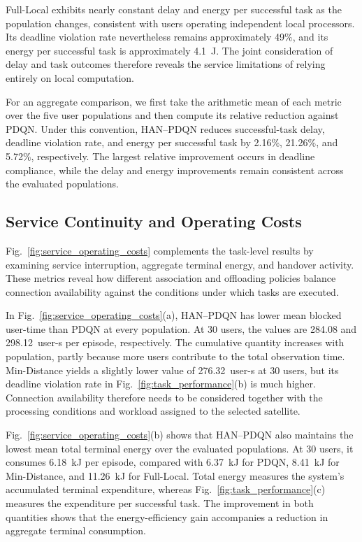 \documentclass[journal]{IEEEtran}
\begin{document}
Full-Local exhibits nearly constant delay and energy
per successful task as the population changes, consistent
with users operating independent local processors.
Its deadline violation rate nevertheless remains
approximately 49\%, and its energy per successful
task is approximately 4.1~J.
The joint consideration of delay and task outcomes
therefore reveals the service limitations of relying
entirely on local computation.

For an aggregate comparison, we first take the arithmetic
mean of each metric over the five user populations
and then compute its relative reduction against PDQN.
Under this convention, HAN--PDQN reduces successful-task
delay, deadline violation rate, and energy per successful
task by 2.16\%, 21.26\%, and 5.72\%, respectively.
The largest relative improvement occurs in deadline
compliance, while the delay and energy improvements
remain consistent across the evaluated populations.



\subsection{Service Continuity and Operating Costs}
\label{subsec:service_operating_costs}

Fig.~\ref{fig:service_operating_costs} complements the
task-level results by examining service interruption,
aggregate terminal energy, and handover activity.
These metrics reveal how different association and
offloading policies balance connection availability
against the conditions under which tasks are executed.

In Fig.~\ref{fig:service_operating_costs}(a), HAN--PDQN
has lower mean blocked user-time than PDQN at every
population. At 30 users, the values are 284.08 and
298.12~user-s per episode, respectively.
The cumulative quantity increases with population,
partly because more users contribute to the total
observation time.
Min-Distance yields a slightly lower value of
276.32~user-s at 30 users, but its deadline violation
rate in Fig.~\ref{fig:task_performance}(b) is much higher.
Connection availability therefore needs to be considered
together with the processing conditions and workload
assigned to the selected satellite.

Fig.~\ref{fig:service_operating_costs}(b) shows that
HAN--PDQN also maintains the lowest mean total
terminal energy over the evaluated populations.
At 30 users, it consumes 6.18~kJ per episode,
compared with 6.37~kJ for PDQN,
8.41~kJ for Min-Distance, and 11.26~kJ for Full-Local.
Total energy measures the system's accumulated
terminal expenditure, whereas
Fig.~\ref{fig:task_performance}(c) measures the
expenditure per successful task.
The improvement in both quantities shows that the
energy-efficiency gain accompanies a reduction in
aggregate terminal consumption.
\end{document}
